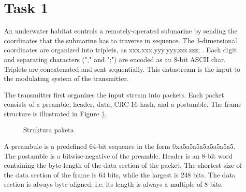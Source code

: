 \documentclass[a4paper]{article}
\begin{document}
\section*{Task 1}
An underwater habitat controls a remotely-operated submarine by sending the coordinates that the submarine has to traverse in sequence. The 3-dimensional coordinates are organized into triplets, as \textsf{xxx.xxx,yyy.yyy,zzz.zzz;} . Each digit and separating characters ("\textsf{,}" and "\textsf{;}") are encoded as an 8-bit ASCII char. Triplets are concatenated and sent sequentially. This datastream is the input to the modulating system of the transmitter.

The transmitter first organizes the input stream into packets. Each packet consists of a preamble, header, data, CRC-16 hash, and a postamble. The frame structure is illustrated in Figure \ref{fig:packet}.

\begin{figure}[h!]
\centering
{}
\caption{Struktura paketa}
\label{fig:packet}
\end{figure}

A preambule is a predefined 64-bit sequence in the form \textsf{0xa5a5a5a5a5a5a5a5}. The postamble is a bitwise-negative of the preamble. Header is an 8-bit word containing the byte-length of the data section of the packet. The shortest size of the data section of the frame is 64 bits, while the largest is 248 bits. The data section is always byte-aligned; i.e. its length is always a multiple of 8 bits.
\end{document}
